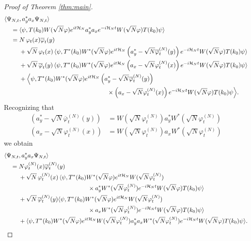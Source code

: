 \documentclass[11pt,a4paper]{article}
\newcommand{\cH}{{\cal H}}
\begin{document}
\begin{proof}[Proof of Theorem \ref{thm:main}]
\[ \begin{split} 
\langle \Psi_{N,t}  &, a_y^* a_x \Psi_{N,t} \rangle \\ = \;  & \langle \psi, T(k_0) W (\sqrt{N} \varphi) e^{it \cH_N} a_y^* a_x e^{-i\cH_N t} W(\sqrt{N} \varphi) T(k_0) \psi \rangle \\  = \; & N \, \varphi_t (x) \overline{\varphi}_t (y) \\ &+  \sqrt{N} \, \varphi_t (x) \, \langle \psi, T^* (k_0) W^* (\sqrt{N} \varphi) e^{it \cH_N} \left(a_y^* - \sqrt{N} \overline{\varphi}^{(N)}_t (y)\right) e^{-i\cH_N t} W(\sqrt{N} \varphi) T(k_0) \psi \rangle \\  &+ \sqrt{N} \, \overline{\varphi}_t (y) \,  \langle \psi, T^* (k_0) W^* (\sqrt{N} \varphi) e^{it \cH_N} \left(a_x - \sqrt{N} \varphi^{(N)}_t (x) \right) e^{-i\cH_N t} W(\sqrt{N} \varphi) T(k_0) \psi \rangle \\ &+ \Big\langle \psi , T^* (k_0) W^* (\sqrt{N} \varphi) e^{it \cH_N} \left(a_y^* -\sqrt{N} \overline{\varphi}_t^{(N)} (y)\right) \\ &\hspace{5cm} \times \left(a_x - \sqrt{N} \varphi^{(N)}_t (x) \right) e^{-i\cH_N t} W(\sqrt{N} \varphi) T(k_0) \psi \Big\rangle. \end{split}\]
Recognizing that
\[ \begin{split} (a_y^* - \sqrt{N} \overline{\varphi}^{(N)}_t (y)) &= W (\sqrt{N} \varphi^{(N)}_t) a_y^* W^* (\sqrt{N} \varphi_t^{(N)}) \\ (a_x - \sqrt{N} \varphi^{(N)}_t (x)) &= W (\sqrt{N} \varphi^{(N)}_t) a_x W^* (\sqrt{N} \varphi_t^{(N)}) \end{split} \]
we obtain
\[ \begin{split} \langle \Psi_{N,t} &, a_y^* a_x \Psi_{N,t} \rangle \\ = \; &N \varphi_t^{(N)} (x) \overline{\varphi}_t^{(N)} (y) \\ &+ \sqrt{N} \, \varphi^{(N)}_t (x) \, \langle \psi, T^* (k_0) W^* (\sqrt{N} \varphi) e^{it \cH_N} W (\sqrt{N} \varphi^{(N)}_t) \\ &\hspace{4cm} \times a_y^* W^* (\sqrt{N} \varphi^{(N)}_t) e^{-i\cH_N t} W(\sqrt{N} \varphi) T(k_0) \psi \rangle \\  &+ \sqrt{N} \, \overline{\varphi}^{(N)}_t (y)  \langle \psi, T^* (k_0) W^* (\sqrt{N} \varphi) e^{it \cH_N} W (\sqrt{N} \varphi^{(N)}_t) \\ &\hspace{4cm} \times a_x W^* (\sqrt{N} \varphi^{(N)}_t) e^{-i\cH_N t} W(\sqrt{N} \varphi) T(k_0) \psi \rangle \\ &+ \langle \psi , T^* (k_0) W^* (\sqrt{N} \varphi) e^{it \cH_N} W (\sqrt{N} \varphi^{(N)}_t) a_y^* a_x W^* (\sqrt{N} \varphi^{(N)}_t)  e^{-i\cH_N t} W(\sqrt{N} \varphi) T(k_0) \psi \rangle. \end{split}\]

\end{proof}
\end{document}

